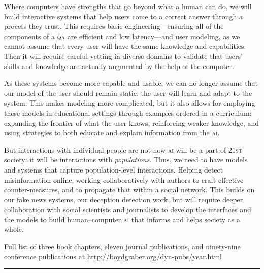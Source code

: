 \documentclass[11pt]{amsart}
\newcommand{\abr}[1]{\textsc{#1}}
\begin{document}
Where computers have strengths that go beyond what a human can do, we
will build interactive systems that help users come to a correct
answer through a process they trust.
%
This requires basic engineering---ensuring all of the components of
a \abr{qa} are efficient and low latency---and user modeling, as we
cannot assume that every user will have the same knowledge and
capabilities.
%
Then it will require careful vetting in diverse domains to validate
that users' skills and knowledge are actually augmented by the help of
the computer.

As these systems become more capable and usable, we can no longer
assume that our model of the user should remain static: the user will
learn and adapt to the system.
%
This makes modeling more complicated, but it also allows for employing
these models in educational settings through examples ordered in a curriculum: expanding the frontier of what
the user knows, reinforcing weaker knowledge, and using strategies to
both educate and explain information from the \abr{ai}.

But interactions with individual people are not how \abr{ai} will be a
part of 21\textsc{st} society: it will be interactions with
\emph{populations}.
%
Thus, we need to have models and systems that capture population-level
interactions.
%
Helping detect misinformation online, working collaboratively with
authors to craft effective counter-measures, and to propagate that
within a social network.
%
This builds on our fake news systems, our deception detection work,
but will require deeper collaboration with social scientists and
journalists to develop the interfaces and the models to build
human--computer \abr{ai} that informs and helps society as a whole.




\clearpage




\begin{center}
Full list of  three book chapters, eleven journal publications, and ninety-nine conference
publications at \url{http://boydgraber.org/dyn-pubs/year.html}
\end{center}


\noindent\rule{4cm}{0.4pt}
\end{document}
